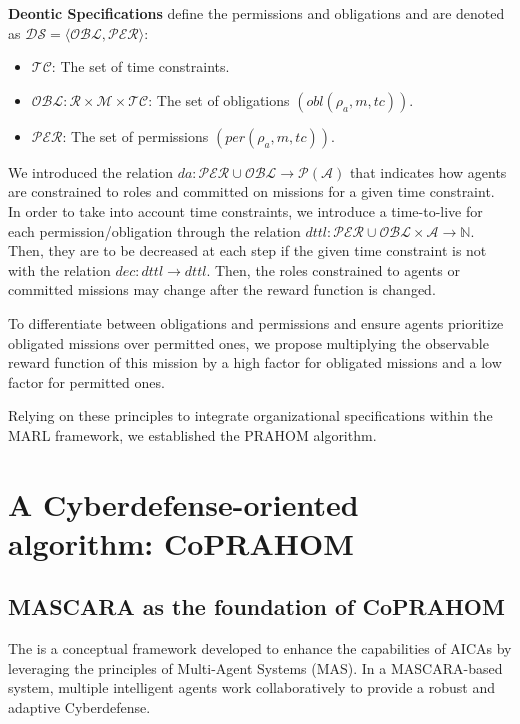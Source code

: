 \documentclass[conference]{IEEEtran}
\newcounter{relation}
\begin{document}
\textbf{Deontic Specifications} define the permissions and obligations and are denoted as $\mathcal{DS} = \langle \mathcal{OBL}, \mathcal{PER} \rangle$:

\begin{itemize}
    \item $\mathcal{TC}$: The set of time constraints.
    \item $\mathcal{OBL}: \mathcal{R} \times \mathcal{M} \times \mathcal{TC}$: The set of obligations $(obl(\rho_a, m, tc))$.
    \item $\mathcal{PER}$: The set of permissions $(per(\rho_a, m, tc))$.
\end{itemize}

We introduced the relation $da: \mathcal{PER} \cup \mathcal{OBL} \rightarrow \mathcal{P}(\mathcal{A})$ that indicates how agents are constrained to roles and committed on missions for a given time constraint. In order to take into account time constraints, we introduce a time-to-live for each permission/obligation through the relation $dttl: \mathcal{PER} \cup \mathcal{OBL} \times \mathcal{A} \rightarrow \mathbb{N}$. Then, they are to be decreased at each step if the given time constraint is not  with the relation $dec: dttl \rightarrow dttl$. Then, the roles constrained to agents or committed missions may change after the reward function is changed.

To differentiate between obligations and permissions and ensure agents prioritize obligated missions over permitted ones, we propose multiplying the observable reward function of this mission by a high factor for obligated missions and a low factor for permitted ones.

Relying on these principles to integrate organizational specifications within the MARL framework, we established the PRAHOM algorithm.


\section{A Cyberdefense-oriented algorithm: CoPRAHOM}\label{sec:prahom_theory}

\subsection{MASCARA as the foundation of CoPRAHOM}

The is a conceptual framework developed to enhance the capabilities of AICAs by leveraging the principles of Multi-Agent Systems (MAS). In a MASCARA-based system, multiple intelligent agents work collaboratively to provide a robust and adaptive Cyberdefense.
\end{document}
